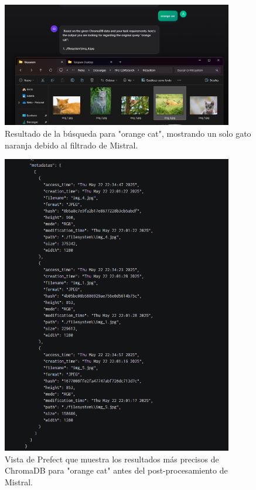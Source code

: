 \begin{figure}[H]
\centering
\includegraphics[width=0.9\textwidth]{archivos/orange_cat_result.png}
\caption[Resultados de búsqueda para "orange cat" con error]{Resultado de la búsqueda para "orange cat", mostrando un solo gato naranja debido al filtrado de Mistral.}
\label{fig:orange_cat_search_result_error}
\end{figure}

\begin{figure}[H]
\centering
\includegraphics[width=0.9\textwidth]{archivos/orange_cat_prefect_result.png}
\caption[Resultados de ChromaDB para "orange cat" en Prefect]{Vista de Prefect que muestra los resultados más precisos de ChromaDB para "orange cat" antes del post-procesamiento de Mistral.}
\label{fig:orange_cat_prefect_result_correct}
\end{figure}

